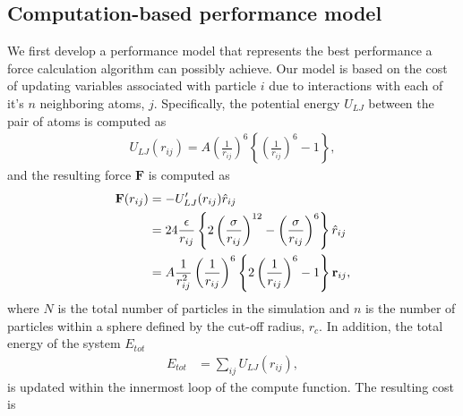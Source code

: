 \documentclass[12pt]{article}
\begin{document}
\subsection{Computation-based performance model}
\label{sec:comp-based-perf}
We first develop a performance model that represents the best
performance a force calculation algorithm can possibly achieve. Our
model is based on the cost of updating variables associated with
particle $i$ due to interactions with each of it's $n$ neighboring
atoms, $j$. Specifically, the potential energy $U_{LJ}$ between the
pair of atoms is computed as
\begin{align}
    U_{LJ}(r_{ij}) = A\left(\frac{1}{r_{ij}}\right)^{6}\left\{ \left(\frac{1}{r_{ij}}\right)^{6} - 1 \right\},           
\end{align}            
and the resulting force $\textbf{F}$ is computed as
\begin{align}
    \textbf{F}(r_{ij}) &= - U'_{LJ}(r_{ij})\hat{r}_{ij} \notag\\
        &= 24 \frac{\epsilon}{r_{ij}} \left\{ 2 \left(\frac{\sigma}{r_{ij}}\right)^{12}
              - \left(\frac{\sigma}{r_{ij}}\right)^6 \right\} \hat{r}_{ij} \notag\\
        &=  A \frac{1}{r_{ij}^2} \left(\frac{1}{r_{ij}}\right)^{6} \left\{ 2 \left(\frac{1}{r_{ij}}\right)^{6}
              - 1 \right\} \textbf{r}_{ij},
\end{align}
where $N$ is the total number of particles in the simulation and $n$
is the number of particles within a sphere defined by the cut-off
radius, $r_c$. In addition, the total energy of the system $E_{tot}$
\begin{align}
    E_{tot} &= \sum_{ij} U_{LJ}(r_{ij}),
\end{align}
is updated within the innermost loop of the compute function. The resulting cost is
\end{document}
